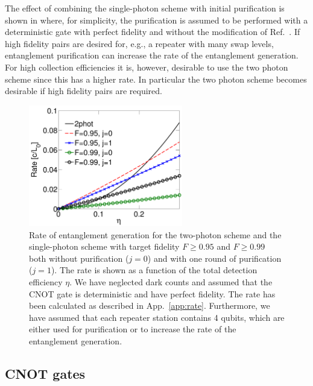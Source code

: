 The effect of combining the single-photon scheme with initial purification is
shown in  where, for simplicity, the purification is
assumed to be performed with a deterministic gate with perfect fidelity and
without the modification of Ref.~\cite{nickerson}. If high fidelity pairs are
desired for, e.g., a repeater with many swap levels, entanglement purification
can increase the rate of the entanglement generation. For high collection
efficiencies it is, however, desirable to use the two photon scheme since this
has a higher rate. In particular the two photon scheme becomes desirable if high
fidelity pairs are required.

\begin{figure} 
\centering
\includegraphics[width=0.6\textwidth]{./figs_Borregaard_PRA2015/figureX3}
\caption[Purification]{Rate of entanglement generation for the two-photon scheme
and the single-photon scheme with target fidelity $F\geq0.95$ and $F\geq0.99$
both without purification ($j=0$) and with one round of purification ($j=1$).
The rate is shown as a function of the total detection efficiency $\eta$. We
have neglected dark counts and assumed that the CNOT gate is deterministic and
have perfect fidelity. The rate has been calculated as described in
App.~\ref{app:rate}. Furthermore, we have assumed that each repeater station
contains 4 qubits, which are either used for purification or to increase the
rate of the entanglement generation. }
\label{fig:figureX3}
\end{figure} 

\subsection{CNOT gates} \label{sec:CNOTgate}

